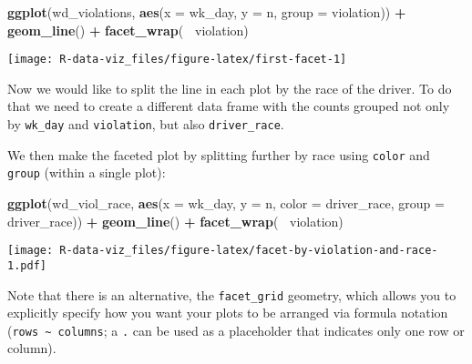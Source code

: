 \documentclass[]{book}
\newenvironment{Shaded}{\begin{snugshade}}{\end{snugshade}}
\newcommand{\KeywordTok}[1]{\textcolor[rgb]{0.13,0.29,0.53}{\textbf{#1}}}
\newcommand{\DataTypeTok}[1]{\textcolor[rgb]{0.13,0.29,0.53}{#1}}
\newcommand{\StringTok}[1]{\textcolor[rgb]{0.31,0.60,0.02}{#1}}
\newcommand{\OperatorTok}[1]{\textcolor[rgb]{0.81,0.36,0.00}{\textbf{#1}}}
\newcommand{\NormalTok}[1]{#1}
\theoremstyle{definition}
\theoremstyle{definition}
\theoremstyle{definition}
\theoremstyle{remark}
\begin{document}
\begin{Shaded}
\begin{Highlighting}[]
\KeywordTok{ggplot}\NormalTok{(wd_violations, }\KeywordTok{aes}\NormalTok{(}\DataTypeTok{x =}\NormalTok{ wk_day, }\DataTypeTok{y =}\NormalTok{ n, }\DataTypeTok{group =}\NormalTok{ violation)) }\OperatorTok{+}
\StringTok{     }\KeywordTok{geom_line}\NormalTok{() }\OperatorTok{+}
\StringTok{     }\KeywordTok{facet_wrap}\NormalTok{(}\OperatorTok{~}\StringTok{ }\NormalTok{violation)}
\end{Highlighting}
\end{Shaded}

\texttt{[image: R-data-viz\_files/figure-latex/first-facet-1]}

Now we would like to split the line in each plot by the race of the
driver. To do that we need to create a different data frame with the
counts grouped not only by \texttt{wk\_day} and \texttt{violation}, but
also \texttt{driver\_race}.

\begin{Shaded}
\end{Shaded}

We then make the faceted plot by splitting further by race using
\texttt{color} and \texttt{group} (within a single plot):

\begin{Shaded}
\begin{Highlighting}[]
\KeywordTok{ggplot}\NormalTok{(wd_viol_race, }\KeywordTok{aes}\NormalTok{(}\DataTypeTok{x =}\NormalTok{ wk_day, }\DataTypeTok{y =}\NormalTok{ n, }\DataTypeTok{color =}\NormalTok{ driver_race, }\DataTypeTok{group =}\NormalTok{ driver_race)) }\OperatorTok{+}
\StringTok{  }\KeywordTok{geom_line}\NormalTok{() }\OperatorTok{+}\StringTok{ }
\StringTok{  }\KeywordTok{facet_wrap}\NormalTok{(}\OperatorTok{~}\StringTok{ }\NormalTok{violation)}
\end{Highlighting}
\end{Shaded}

\texttt{[image: R-data-viz\_files/figure-latex/facet-by-violation-and-race-1.pdf]}

Note that there is an alternative, the \texttt{facet\_grid} geometry,
which allows you to explicitly specify how you want your plots to be
arranged via formula notation
(\texttt{rows\ \textasciitilde{}\ columns}; a \texttt{.} can be used as
a placeholder that indicates only one row or column).
\end{document}
